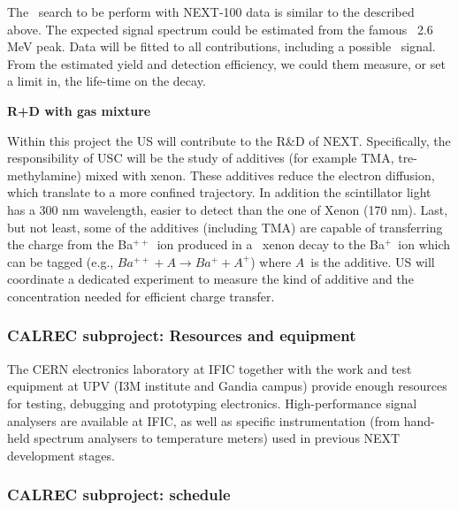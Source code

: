 The \bbonu\ search to be perform with NEXT-100 data is similar to the described above. The expected signal spectrum could be estimated from the famous \Tl ~2.6 MeV peak. 
Data will be fitted to all contributions, including a possible \bbonu ~signal.
From the estimated yield and detection efficiency, we could them measure, or set a limit in, the life-time on the \bbonu decay.

{\bf R+D with gas mixture}

Within this project the US will contribute to the R\&D of NEXT. Specifically, the responsibility of USC will be the study of additives (for example TMA, tre-methylamine) mixed with xenon.  These additives reduce the electron diffusion, which translate to a more confined trajectory.  In addition the scintillator light has  a 300 nm wavelength, easier to detect than the one of Xenon (170 nm). Last, but not least, some of the additives (including TMA) are capable of transferring the charge from the Ba$^{++}$~ion produced in a \bb\ xenon decay to
the Ba$^{+}$~ion which can be tagged (e.g., $Ba^{++} + A \rightarrow Ba^{+} + A^{+}$) where $A$~is the additive. US will coordinate a dedicated experiment to measure the kind of additive and the concentration needed for efficient charge transfer. 


\subsubsection*{CALREC subproject: Resources and equipment}

The CERN electronics laboratory at IFIC together with the work and test equipment at UPV (I3M institute and Gandia campus) provide enough resources for testing, debugging and prototyping electronics. High-performance signal analysers are available at IFIC, as well as specific instrumentation (from hand-held spectrum analysers to temperature meters) used in previous NEXT development stages.

\subsubsection*{CALREC subproject: schedule}
